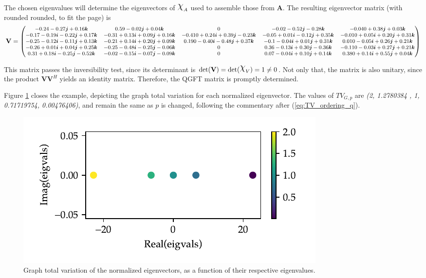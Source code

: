 \begin{landscape}
The chosen eigenvalues will determine the eigenvectors of $\rchi_A$ used to assemble those from $\mathbf{A}$. The resulting eigenvector matrix (with rounded rounded, to fit the page) is
\begin{equation*}
\footnotesize
\mathbf{V} = \left(\begin{matrix}
-0.24  -0.27\boldsymbol{j} +0.16\boldsymbol{k} & 0.59  -0.02\boldsymbol{j} +0.04\boldsymbol{k} & 0  & -0.02  -0.52\boldsymbol{j} -0.28\boldsymbol{k} & -0.040  +0.38\boldsymbol{j} +0.03\boldsymbol{k} \\
-0.17 -0.19\boldsymbol{i} -0.22\boldsymbol{j} +0.17\boldsymbol{k} & -0.31 +0.13\boldsymbol{i} +0.09\boldsymbol{j} +0.16\boldsymbol{k} & -0.410 +0.24\boldsymbol{i} +0.39\boldsymbol{j} -0.23\boldsymbol{k}  & -0.05 +0.01\boldsymbol{i} -0.12\boldsymbol{j} +0.35\boldsymbol{k} & -0.010 +0.05\boldsymbol{i} +0.20\boldsymbol{j} +0.31\boldsymbol{k} \\
-0.25 -0.12\boldsymbol{i} -0.11\boldsymbol{j} +0.13\boldsymbol{k} & -0.21 +0.14\boldsymbol{i} +0.20\boldsymbol{j} +0.09\boldsymbol{k} & 0.190 -0.40\boldsymbol{i} -0.48\boldsymbol{j} +0.37\boldsymbol{k}  & -0.1 -0.04\boldsymbol{i} +0.01\boldsymbol{j} +0.31\boldsymbol{k} & 0.010 -0.05\boldsymbol{i} +0.26\boldsymbol{j} +0.21\boldsymbol{k} \\
-0.26 +0.01\boldsymbol{i} +0.04\boldsymbol{j} +0.25\boldsymbol{k} & -0.25 -0.48\boldsymbol{i} -0.25\boldsymbol{j} -0.06\boldsymbol{k} & 0  & 0.36 -0.13\boldsymbol{i} +0.30\boldsymbol{j} -0.36\boldsymbol{k} & -0.110 -0.03\boldsymbol{i} +0.27\boldsymbol{j} +0.21\boldsymbol{k} \\
0.31 +0.18\boldsymbol{i} -0.25\boldsymbol{j} -0.52\boldsymbol{k} & -0.02 -0.15\boldsymbol{i} -0.07\boldsymbol{j} -0.09\boldsymbol{k} & 0  & 0.07 -0.04\boldsymbol{i} +0.10\boldsymbol{j} +0.14\boldsymbol{k} & 0.380 +0.14\boldsymbol{i} +0.55\boldsymbol{j} +0.04\boldsymbol{k} \\
\end{matrix}\right)
\end{equation*}

This matrix passes the inversibility test, since its determinant is $\mathrm{det}(\mathbf{V}) = \mathrm{det}(\rchi_V) = 1 \neq 0$. Not only that, the matrix is also unitary, since the product $\mathbf{V} \mathbf{V}^H$ yields an identity matrix. Therefore, the QGFT matrix is promptly determined.

Figure \ref{fig:simple_example_tv} closes the example, depicting the graph total variation for each normalized eigenvector. The values of $TV_{G, p}$ are \textit{(2, 1.2780384 , 1, 0.71719754, 0.00476406)}, and remain the same as $p$ is changed, following the commentary after (\ref{eq:TV_ordering_q}).

\begin{figure}
\centering
\includegraphics[width=0.35\linewidth]{thesis/Figures/simple_example_tv.pdf}
\caption{Graph total variation of the normalized eigenvectors, as a function of their respective eigenvalues.}
\label{fig:simple_example_tv}
\end{figure}

\end{landscape}

